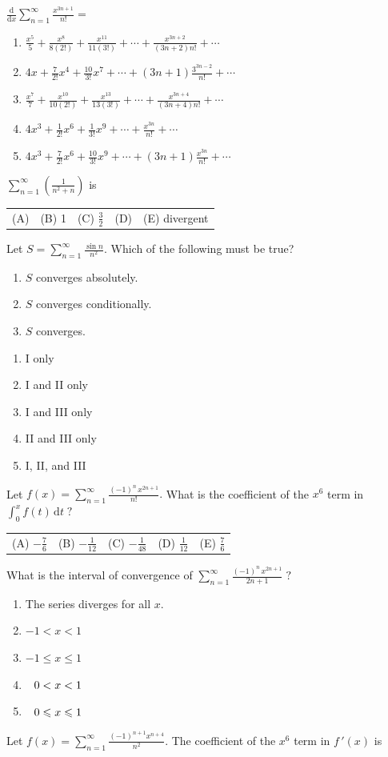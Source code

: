 \documentclass[letterstyle,12pt]{extarticle}
\newcounter{qcounter}
\newcommand{\nspace}{\hspace{2.52mm}}
\newcommand{\di}{\, \text{d}}
\newcommand{\choices}[5]{
\vspace{0.8em} 
\begin{enumerate}[label=(\Alph*)]
\setlength\itemsep{1em} 
\item
#1 
\item 
#2
\item
#3
\item
#4
\item
#5
\end{enumerate}
}
\newcommand{\choicesline}[5]{    
\vspace{2em} \break 
\begin{tabularx}{0.95 \textwidth} { 
>{\arraybackslash}X 
>{\arraybackslash}X 
>{\arraybackslash}X 
>{\arraybackslash}X 
>{\arraybackslash}X }
(A) \; #1
& 
(B) \; #2
& 
(C) \; #3
& 
(D) \; #4
&
(E) \; #5 
\end{tabularx}
\vspace{2em} \break
}
\newcommand{\ans}[1]{{\color{black} #1}}
\newenvironment{question}
    {\begin{minipage}{0.9 \textwidth}
        \item
    }
    { 
    \end{minipage} \vspace{4ex}
    }
\newcommand{\romanlist}[1]{\begin{enumerate}[label=\Roman*., leftmargin=15mm] #1 \end{enumerate}}
\begin{document}
\begin{list}{\textbf{.}~}{}
\begin{question}
\(\frac{\text{d}}{\text{d} x} \sum_{n = 1}^\infty \frac{x^{3n + 1}}{n!} = \)
\choices
{\(\frac{x^5}{5} + \frac{x^8}{8(2!)} + \frac{x^{11}}{11(3!)} + \cdots + \frac{x^{3n + 2}}{(3n + 2) n!} + \cdots\)}
{\(4x + \frac{7}{2!} x^4 + \frac{10}{3!} x^7 + \cdots + (3n + 1) \frac{3^{3n - 2}}{n!} + \cdots\)}
{\(\frac{x^7}{7} + \frac{x^{10}}{10(2!)} + \frac{x^{13}}{13(3!)} + \cdots + \frac{x^{3n + 4}}{(3n + 4) n!} + \cdots \)}
{\(4x^3 + \frac{1}{2!} x^6 + \frac{1}{3!} x^9 + \cdots + \frac{x^{3n}}{n!} + \cdots\)}
{\ans{\(4x^3 + \frac{7}{2!} x^6 + \frac{10}{3!} x^9 + \cdots + (3n + 1) \frac{x^{3n}}{n!} + \cdots\)}}
\end{question}

\begin{question}
\(\sum_{n = 1}^\infty \left(\frac{1}{n^2 + n}\right)\) is
\choicesline
{0}
{\ans 1}
{\(\frac{3}{2}\)}
{2}
{divergent}
\end{question}

\begin{question}
Let \(S = \sum_{n = 1}^\infty \frac{\sin n}{n^2}.\) Which of the following must be true?
\romanlist{
\item
\(S\) converges absolutely.
\item 
\(S\) converges conditionally.
\item
\(S\) converges.
}
\choices
{I only}
{I and II only}
{\ans{I and III only}}
{II and III only}
{I, II, and III}
\end{question}

\begin{question}
Let \(f(x) = \sum_{n = 1}^\infty \frac{(-1)^n \, x^{2n + 1}}{n!}.\) 
What is the coefficient of the \(x^6\) term in \(\int_0^x f(t) \di t \; ?\)
\choicesline
{\(-\frac{7}{6}\)}
{\(-\frac{1}{12}\)}
{\(-\frac{1}{48}\)}
{\ans{\(\frac{1}{12}\)}}
{\(\frac{7}{6}\)}
\end{question}

\clearpage

\begin{question}
What is the interval of convergence of \(\sum_{n = 1}^\infty \frac{(-1)^n \, x^{2n + 1}}{2n + 1} \; ?\)
\choices
{The series diverges for all \(x.\)}
{\(-1 < x < 1\)}
{\ans{\(-1 \leqslant x \leqslant 1\)}}
{\(\nspace 0 < x < 1\)}
{\(\nspace 0 \leqslant x \leqslant 1\)}
\end{question}

\begin{question}
Let \(f(x) = \sum_{n = 1}^\infty \frac{(-1)^{n + 1} x^{n + 4} }{n^2}.\) The coefficient of the \(x^6\) term in \(f \, '(x)\) is 


\end{question}
\end{list}
\end{document}
